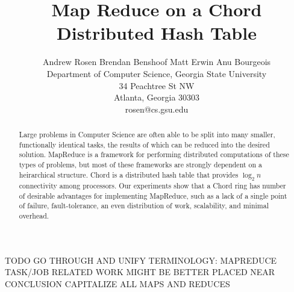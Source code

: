 \documentclass[conference, compsocconf, letterpaper]{IEEEtran}
\title{Map Reduce on a Chord Distributed Hash Table}
\author{
Andrew Rosen \qquad Brendan Benshoof \qquad Matt Erwin \qquad Anu Bourgeois  \\Department of Computer Science, Georgia State University\\ 34 Peachtree St NW \\ Atlanta, Georgia 30303\\  rosen@cs.gsu.edu }
\begin{document}
\maketitle

\begin{abstract}

Large problems in Computer Science are often able to be split into many smaller, functionally identical tasks, the results of which can be reduced into the desired solution.  MapReduce is a framework for 
performing distributed computations of these types of problems, but most of these frameworks are strongly dependent on a heirarchical structure.  Chord is a distributed hash table that provides $\log_{2}n$ connectivity among processors.  Our experiments show that a Chord ring has number of desirable advantages for implementing MapReduce, such as a lack of a single point of failure, fault-tolerance, an even distribution of work, scalability, and minimal overhead.


\end{abstract}

TODO GO THROUGH AND UNIFY TERMINOLOGY:  MAPREDUCE TASK/JOB
RELATED WORK MIGHT BE BETTER PLACED NEAR CONCLUSION
CAPITALIZE ALL MAPS AND REDUCES
\end{document}
